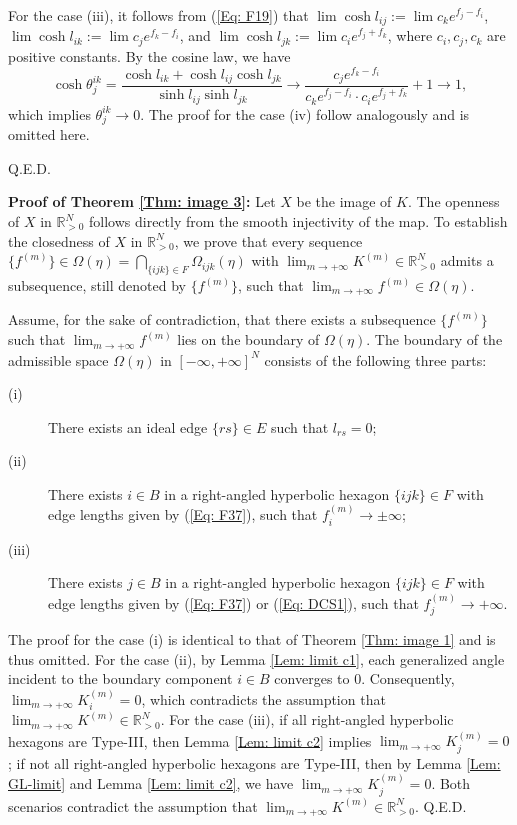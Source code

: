 \documentclass[12pt]{amsart}
\theoremstyle{definition}
\def\qed{\hfill{Q.E.D.}\smallskip}
\begin{document}
For the case (iii), it follows from (\ref{Eq: F19}) that $\lim\cosh l_{ij}:=\lim c_ke^{f_j-f_i}$,\ $\lim\cosh l_{ik}:=\lim c_je^{f_k-f_i}$, and $\lim\cosh l_{jk}:=\lim c_ie^{f_j+f_k}$,
where $c_i, c_j, c_k$ are positive constants.
By the cosine law, we have
\begin{equation*}
\cosh \theta^{ik}_j=\frac{\cosh l_{ik}+\cosh l_{ij}\cosh l_{jk}}{\sinh l_{ij}\sinh l_{jk}}\rightarrow
\frac{c_je^{f_k-f_i}}{c_ke^{f_j-f_i}\cdot c_ie^{f_j+f_k}}+1
\rightarrow 1,
\end{equation*}
which implies $\theta^{ik}_j\rightarrow 0$.
The proof for the case (iv) follow analogously and is omitted here.

\qed

\noindent\textbf{Proof of Theorem \ref{Thm: image 3}:}
Let $X$ be the image of $K$.
The openness of $X$ in $\mathbb{R}^N_{>0}$ follows directly from the smooth injectivity of the map.
To establish the closedness of $X$ in $\mathbb{R}^N_{>0}$, 
we prove that every sequence $\{f^{(m)}\}\in\Omega(\eta)=\bigcap_{\{ijk\}\in F}\Omega_{ijk}(\eta)$ with $\lim_{m\rightarrow +\infty}K^{(m)}\in \mathbb{R}^N_{>0}$ admits a subsequence, still denoted by $\{f^{(m)}\}$, such that $\lim_{m\rightarrow +\infty}f^{(m)}\in\Omega(\eta)$.

Assume, for the sake of contradiction, that there exists a subsequence $\{f^{(m)}\}$ such that $\lim_{m\rightarrow +\infty}f^{(m)}$ lies on the boundary of $\Omega(\eta)$.
The boundary of the admissible space $\Omega(\eta)$ in $[-\infty,+\infty]^N$ consists of the following three parts:
\begin{description}
\item[(i)]
There exists an ideal edge $\{rs\}\in E$ such that $l_{rs}=0$;
\item[(ii)]
There exists $i\in B$ in a right-angled hyperbolic hexagon $\{ijk\}\in F$ with edge lengths given by (\ref{Eq: F37}), such that $f_i^{(m)}\rightarrow \pm\infty$;
\item[(iii)]
There exists $j\in B$ in a right-angled hyperbolic hexagon $\{ijk\}\in F$ with edge lengths given by (\ref{Eq: F37}) or (\ref{Eq: DCS1}), such that $f_j^{(m)}\rightarrow +\infty$.
\end{description}
The proof for the case (i) is identical to that of Theorem \ref{Thm: image 1} and is thus omitted. 
For the case (ii), by Lemma \ref{Lem: limit c1}, each generalized angle incident to the boundary component $i\in B$ converges to 0.
Consequently, $\lim_{m\rightarrow +\infty}K_i^{(m)}=0$,
which contradicts the assumption that $\lim_{m\rightarrow +\infty}K^{(m)}\in \mathbb{R}^N_{>0}$.
For the case (iii),
if all right-angled hyperbolic hexagons are Type-III,
then Lemma \ref{Lem: limit c2} implies $\lim_{m\rightarrow +\infty}K_j^{(m)}=0$;
if not all right-angled hyperbolic hexagons are Type-III,
then by Lemma \ref{Lem: GL-limit} and Lemma \ref{Lem: limit c2}, we have $\lim_{m\rightarrow +\infty}K_j^{(m)}=0$.
Both scenarios contradict the assumption that $\lim_{m\rightarrow +\infty}K^{(m)}\in \mathbb{R}^N_{>0}$.
\qed
\end{document}
